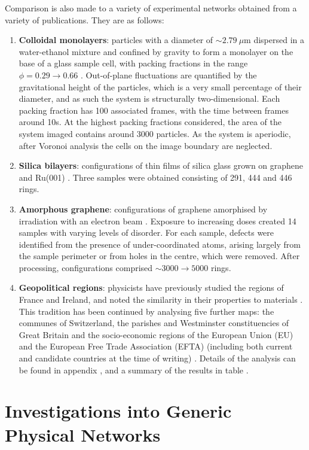 Comparison is also made to a variety of experimental networks obtained from a variety of publications.
They are as follows:
\begin{enumerate}
	\item \textbf{Colloidal monolayers}: particles with a diameter of $\sim 2.79~\mu$m dispersed in a water\--ethanol mixture and confined by gravity to form a monolayer on the base of a glass sample cell, with packing fractions in the range $\phi=0.29\rightarrow 0.66$ \cite{Thorneywork2017}.
Out\--of\--plane fluctuations are quantified by the gravitational height of the particles, which is a very small percentage of their diameter, and as such the system is structurally two-dimensional.
Each packing fraction has 100 associated frames, with the time between frames around 10s.
At the highest packing fractions considered, the area of the system imaged contains around 3000 particles.
As the system is aperiodic, after Voronoi analysis the cells on the image boundary are neglected.
\item \textbf{Silica bilayers}: configurations of thin films of silica glass grown on graphene \cite{Huang2012} and Ru(001) \cite{Buchner2017}.
Three samples were obtained consisting of 291, 444 and 446 rings.
\item \textbf{Amorphous graphene}: configurations of graphene amorphised by irradiation with an electron beam \cite{Eder2014}.
Exposure to increasing doses created 14 samples with varying levels of disorder.
For each sample, defects were identified from the presence of under\--coordinated atoms, arising largely from the sample perimeter or from holes in the centre, which were removed.
After processing, configurations comprised $\sim3000\rightarrow5000$ rings.
\item \textbf{Geopolitical regions}: physicists have previously studied the regions of France and Ireland, and noted the similarity in their properties to materials \cite{LeCaer1993,Okabe1992}.
This tradition has been continued by analysing five further maps: the communes of Switzerland, the parishes and Westminster constituencies of Great Britain and the socio\--economic regions of the European Union (EU) and the European Free Trade Association (EFTA) (including both current and candidate countries at the time of writing) \cite{osmap,chmap,eumap}. Details of the analysis can be found in appendix , and a summary of the results in table .
\end{enumerate}

\section{Investigations into Generic Physical Networks}

